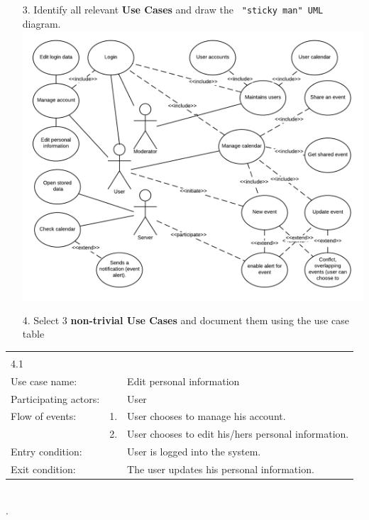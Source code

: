 \documentclass{article}
\begin{document}
	\begin{enumerate}
		\item[3.] Identify all  relevant \textbf{Use Cases} and draw the \verb= "sticky man" UML= diagram.\\
		\includegraphics[scale = 0.38]{UserCases.png}\\
		\pagebreak{}
		\item[4.] Select 3 \textbf{non-trivial Use Cases} and document them using the use case table\\
	\end{enumerate}
\begin{tabular}{l r @{} l}
	\multicolumn{2}{c}{} \\
	4.1&&\\
	\hline
	Use case name:	&&Edit personal information\\
	\hline
	Participating actors:&&User \\
	\hline
	Flow of events:	&1.&User chooses to manage his account.\\
				&2.&User chooses to edit his/hers personal information.\\
	\hline
	Entry condition:	&&User is logged into the system.\\
	\hline
	Exit condition:	&&The user updates his personal information.\\
	\hline
\end{tabular}
	\\
	.\\
\end{document}
